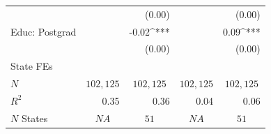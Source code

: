\begin{tabular}{l D{.}{.}{6.5} D{.}{.}{6.5} D{.}{.}{6.5} D{.}{.}{6.5}}
                   &                      & (0.00)                         &                      & (0.00)                         \\
Educ: Postgrad     &                      & -0.02^{***}                    &                      & 0.09^{***}                     \\
                   &                      & (0.00)                         &                      & (0.00)                         \\
\midrule
State FEs          &  &  &  &  \\
$N$ &  &  &  &   \\
$R^2$              & 0.35                 & 0.36                           & 0.04                 & 0.06                           \\
$N$ States &  &  &  &   \\
\bottomrule
\end{tabular}